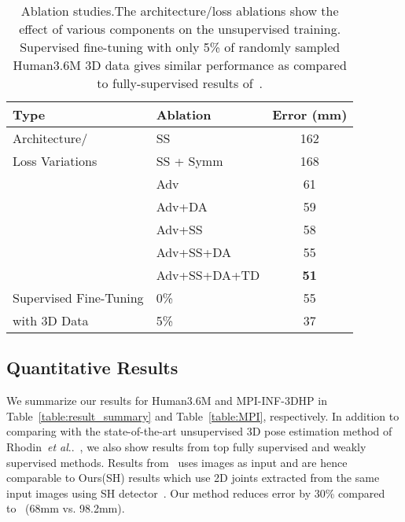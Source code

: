\documentclass[10pt,twocolumn,letterpaper]{article}
\makeatletter
\DeclareRobustCommand\onedot{\futurelet\@let@token\@onedot}
\def\@onedot{\ifx\@let@token.\else.\null\fi\xspace}
\def\etal{\emph{et al}\onedot}
\makeatother
\begin{document}
\begin{table}[htb!]
\centering
\begin{tabularx}{\linewidth}{lXc}\toprule
	Type & Ablation & Error (mm) \\
	\midrule \midrule
	Architecture/ &SS & 162 \\
Loss Variations	&SS + Symm  & 168 \\
	&Adv& 61 \\
	&Adv+DA & 59 \\
	&Adv+SS & 58 \\
	&Adv+SS+DA & 55 \\
&Adv+SS+DA+TD & \textbf{51} \\
	\midrule
	Supervised Fine-Tuning &0\% & 55 \\
with 3D Data	&5\%  & 37 \\
\bottomrule
\end{tabularx}
\caption{Ablation studies.The architecture/loss ablations show the effect of various components on the unsupervised training. Supervised fine-tuning with only 5\% of randomly sampled Human3.6M 3D data gives similar performance as compared to fully-supervised results of~\cite{MartinezICCV2017}.}
\label{table:result_ablation}
\vspace{-3ex}
\end{table}





%
 
\subsection{Quantitative Results}
\label{subsect:quant_results}


We summarize our results for Human3.6M and MPI-INF-3DHP in Table~\ref{table:result_summary} and Table~\ref{table:MPI}, respectively. In addition to comparing with the state-of-the-art unsupervised 3D pose estimation method of Rhodin~\etal~\cite{Rhodin_2018_ECCV}, we also show results from top fully supervised and weakly supervised methods. Results from~\cite{Rhodin_2018_ECCV} uses images as input and are hence comparable to Ours(SH) results which use 2D joints extracted from the same input images using SH detector~\cite{stacked-hourglass}. Our method reduces error by 30\% compared to~\cite{Rhodin_2018_ECCV} (68mm vs. 98.2mm).
\end{document}
